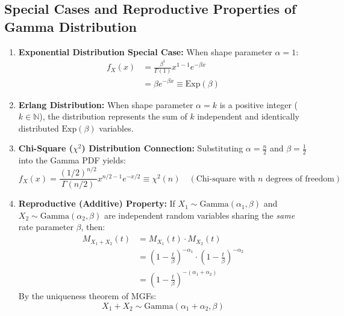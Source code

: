 \documentclass[12pt,a4paper]{article}
\begin{document}
\subsection{Special Cases and Reproductive Properties of Gamma Distribution}
\begin{enumerate}[leftmargin=*, itemsep=3pt]
  \item \textbf{Exponential Distribution Special Case:} When shape parameter $\alpha = 1$:
  \begin{equation}
    \begin{aligned}
      f_X(x) &= \frac{\beta^1}{\Gamma(1)} x^{1-1} e^{-\beta x} \\[3pt]
      &= \beta e^{-\beta x} \equiv \text{Exp}(\beta)
    \end{aligned}
  \end{equation}
  \item \textbf{Erlang Distribution:} When shape parameter $\alpha = k$ is a positive integer ($k \in \mathbb{N}$), the distribution represents the sum of $k$ independent and identically distributed $\text{Exp}(\beta)$ variables.
  \item \textbf{Chi-Square ($\chi^2$) Distribution Connection:} Substituting $\alpha = \frac{n}{2}$ and $\beta = \frac{1}{2}$ into the Gamma PDF yields:
  \begin{equation}
    f_X(x) = \frac{(1/2)^{n/2}}{\Gamma(n/2)} x^{n/2 - 1} e^{-x/2} \equiv \chi^2(n) \quad (\text{Chi-square with } n \text{ degrees of freedom})
  \end{equation}
  \item \textbf{Reproductive (Additive) Property:} If $X_1 \sim \text{Gamma}(\alpha_1, \beta)$ and $X_2 \sim \text{Gamma}(\alpha_2, \beta)$ are independent random variables sharing the \textit{same} rate parameter $\beta$, then:
  \begin{equation}
    \begin{aligned}
      M_{X_1+X_2}(t) &= M_{X_1}(t) \cdot M_{X_2}(t) \\[3pt]
      &= \left(1 - \frac{t}{\beta}\right)^{-\alpha_1} \cdot \left(1 - \frac{t}{\beta}\right)^{-\alpha_2} \\[3pt]
      &= \left(1 - \frac{t}{\beta}\right)^{-(\alpha_1+\alpha_2)}
    \end{aligned}
  \end{equation}
  By the uniqueness theorem of MGFs:
  \begin{equation}
    X_1 + X_2 \sim \text{Gamma}(\alpha_1 + \alpha_2, \beta)
  \end{equation}
\end{enumerate}
\end{document}
